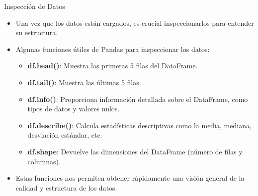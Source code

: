 \documentclass[spanish]{beamer}
\begin{document}
\begin{frame}{Inspección de Datos}
    \begin{itemize}
        \item Una vez que los datos están cargados, es crucial inspeccionarlos para entender su estructura.
        \item Algunas funciones útiles de Pandas para inspeccionar los datos:
        \begin{itemize}
            \item \textbf{df.head()}: Muestra las primeras 5 filas del DataFrame.
            \item \textbf{df.tail()}: Muestra las últimas 5 filas.
            \item \textbf{df.info()}: Proporciona información detallada sobre el DataFrame, como tipos de datos y valores nulos.
            \item \textbf{df.describe()}: Calcula estadísticas descriptivas como la media, mediana, desviación estándar, etc.
            \item \textbf{df.shape}: Devuelve las dimensiones del DataFrame (número de filas y columnas).
        \end{itemize}
        \item Estas funciones nos permiten obtener rápidamente una visión general de la calidad y estructura de los datos.
    \end{itemize}
\end{frame}
\end{document}
